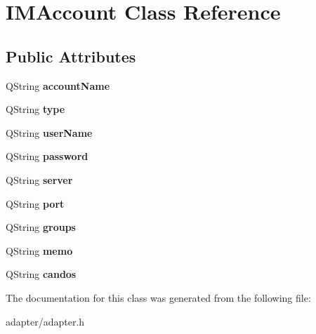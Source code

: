 \hypertarget{classIMAccount}{
\section{IMAccount Class Reference}
\label{classIMAccount}
}
\subsection*{Public Attributes}
\begin{DoxyCompactItemize}
\item 
\hypertarget{classIMAccount_af652309a02d7266cae38f8b9cf75f8af}{
QString {\bfseries accountName}}
\label{classIMAccount_af652309a02d7266cae38f8b9cf75f8af}

\item 
\hypertarget{classIMAccount_a37e95892d4825c7fbd98e173ee42cdba}{
QString {\bfseries type}}
\label{classIMAccount_a37e95892d4825c7fbd98e173ee42cdba}

\item 
\hypertarget{classIMAccount_af0a5bb5484cf39cdb59522bfc2835460}{
QString {\bfseries userName}}
\label{classIMAccount_af0a5bb5484cf39cdb59522bfc2835460}

\item 
\hypertarget{classIMAccount_a78b8b7b36578abb2f477b58fc2698339}{
QString {\bfseries password}}
\label{classIMAccount_a78b8b7b36578abb2f477b58fc2698339}

\item 
\hypertarget{classIMAccount_ab1f168fd1a7ea076426a642e227ab1a8}{
QString {\bfseries server}}
\label{classIMAccount_ab1f168fd1a7ea076426a642e227ab1a8}

\item 
\hypertarget{classIMAccount_a122ffdf1e9c248629abc736939ad6933}{
QString {\bfseries port}}
\label{classIMAccount_a122ffdf1e9c248629abc736939ad6933}

\item 
\hypertarget{classIMAccount_ac4efa2b87d161958f390660082642241}{
QString {\bfseries groups}}
\label{classIMAccount_ac4efa2b87d161958f390660082642241}

\item 
\hypertarget{classIMAccount_a3a0520db9eb280fafc29f9a7035784ca}{
QString {\bfseries memo}}
\label{classIMAccount_a3a0520db9eb280fafc29f9a7035784ca}

\item 
\hypertarget{classIMAccount_a080963b68a91e1885a3f90e8f851efaa}{
QString {\bfseries candos}}
\label{classIMAccount_a080963b68a91e1885a3f90e8f851efaa}

\end{DoxyCompactItemize}


The documentation for this class was generated from the following file:\begin{DoxyCompactItemize}
\item 
adapter/adapter.h\end{DoxyCompactItemize}
